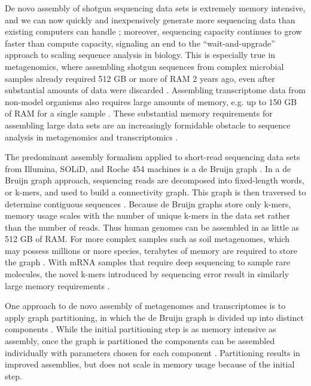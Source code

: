 \documentclass[12pt]{article} \usepackage{simplemargins}
\begin{document}
De novo assembly of shotgun sequencing data sets is extremely memory
intensive, and we can now quickly and inexpensively generate more
sequencing data than existing computers can handle
\cite{pubmed21310981}; moreover, sequencing capacity continues to grow
faster than compute capacity, signaling an end to the
``wait-and-upgrade'' approach to scaling sequence analysis in biology.
This is especially true in metagenomics, where assembling shotgun
sequences from complex microbial samples already required 512 GB or
more of RAM 2 years ago, even after substantial amounts of data were
discarded \cite{pmid20203603, pmid21273488}.  Assembling transcriptome
data from non-model organisms also requires large amounts of memory,
e.g. up to 150 GB of RAM for a single sample \cite{trinity}.  These
substantial memory requirements for assembling large data sets are
an increasingly formidable obstacle to sequence analysis in metagenomics and
transcriptomics \cite{trinity,pubmed21310981,pubmed21304727}.


The predominant assembly formalism applied to short-read sequencing
data sets from Illumina, SOLiD, and Roche 454 machines is a de Bruijn
graph \cite{pubmed20211242,pubmed22068540}.  In a de Bruijn graph
approach, sequencing reads are decomposed into fixed-length words, or
k-mers, and used to build a connectivity graph.  This graph is then
traversed to determine contiguous sequences \cite{pubmed22068540}.
Because de Bruijn graphs store only k-mers, memory usage scales with
the number of unique k-mers in the data set rather than the number of
reads.  Thus human genomes can be assembled in as little as 512 GB of
RAM\cite{pmid21187386}.  For more complex samples such as soil
metagenomes, which may possess millions or more species, terabytes of
memory are required to store the graph \cite{pubmed21304727}.  With
mRNA samples that require deep sequencing to sample rare molecules,
the novel k-mers introduced by sequencing error result in similarly
large memory requirements \cite{trinity}.

One approach to de novo assembly of metagenomes and transcriptomes is
to apply graph partitioning, in which the de Bruijn graph is divided
up into distinct components \cite{trinity, metavelvet,pubmed21685107}.
While the initial partitioning step is as memory intensive as
assembly, once the graph is partitioned the components can be
assembled individually with parameters chosen for each component
\cite{metavelvet,pubmed21685107}.  Partitioning results in improved
assemblies, but does not scale in memory usage because of the
initial step.
\end{document}
